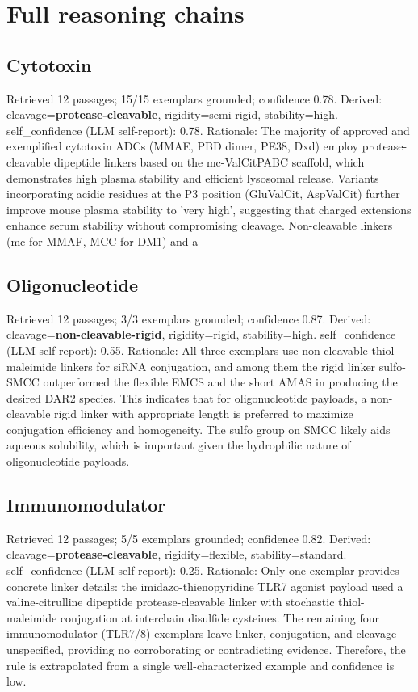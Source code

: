 \documentclass[10pt]{article}
\begin{document}
\section{Full reasoning chains}
\subsection{Cytotoxin}
Retrieved 12 passages; 15/15 exemplars grounded; confidence 0.78. Derived: cleavage=\textbf{protease-cleavable}, rigidity=semi-rigid, stability=high. self\_confidence (LLM self-report): 0.78. Rationale: The majority of approved and exemplified cytotoxin ADCs (MMAE, PBD dimer, PE38, Dxd) employ protease-cleavable dipeptide linkers based on the mc-ValCitPABC scaffold, which demonstrates high plasma stability and efficient lysosomal release. Variants incorporating acidic residues at the P3 position (GluValCit, AspValCit) further improve mouse plasma stability to 'very high', suggesting that charged extensions enhance serum stability without compromising cleavage. Non-cleavable linkers (mc for MMAF, MCC for DM1) and a
\subsection{Oligonucleotide}
Retrieved 12 passages; 3/3 exemplars grounded; confidence 0.87. Derived: cleavage=\textbf{non-cleavable-rigid}, rigidity=rigid, stability=high. self\_confidence (LLM self-report): 0.55. Rationale: All three exemplars use non-cleavable thiol-maleimide linkers for siRNA conjugation, and among them the rigid linker sulfo-SMCC outperformed the flexible EMCS and the short AMAS in producing the desired DAR2 species. This indicates that for oligonucleotide payloads, a non-cleavable rigid linker with appropriate length is preferred to maximize conjugation efficiency and homogeneity. The sulfo group on SMCC likely aids aqueous solubility, which is important given the hydrophilic nature of oligonucleotide payloads.
\subsection{Immunomodulator}
Retrieved 12 passages; 5/5 exemplars grounded; confidence 0.82. Derived: cleavage=\textbf{protease-cleavable}, rigidity=flexible, stability=standard. self\_confidence (LLM self-report): 0.25. Rationale: Only one exemplar provides concrete linker details: the imidazo-thienopyridine TLR7 agonist payload used a valine-citrulline dipeptide protease-cleavable linker with stochastic thiol-maleimide conjugation at interchain disulfide cysteines. The remaining four immunomodulator (TLR7/8) exemplars leave linker, conjugation, and cleavage unspecified, providing no corroborating or contradicting evidence. Therefore, the rule is extrapolated from a single well-characterized example and confidence is low.
\end{document}
